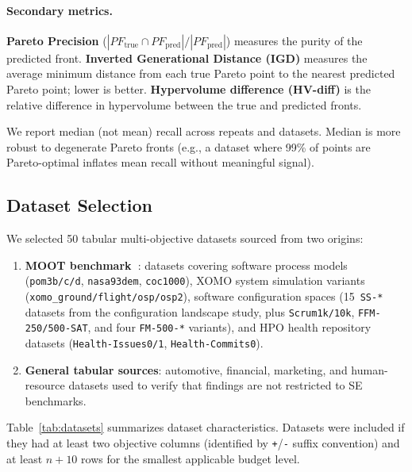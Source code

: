 \documentclass[sigconf,nonacm]{acmart}
\begin{document}
\paragraph{Secondary metrics.}
\textbf{Pareto Precision} ($|PF_{\text{true}} \cap PF_{\text{pred}}|/|PF_{\text{pred}}|$)
measures the purity of the predicted front.
\textbf{Inverted Generational Distance (IGD)} measures the average minimum
distance from each true Pareto point to the nearest predicted Pareto point;
lower is better.
\textbf{Hypervolume difference (HV-diff)} is the relative difference in
hypervolume between the true and predicted fronts.

We report median (not mean) recall across repeats and datasets.
Median is more robust to degenerate Pareto fronts (e.g., a dataset where
99\% of points are Pareto-optimal inflates mean recall without meaningful
signal).

\subsection{Dataset Selection}
\label{sec:datasets}

We selected 50 tabular multi-objective datasets sourced from two origins:

\begin{enumerate}[leftmargin=*]
  \item \textbf{MOOT benchmark~\cite{moot2025}}: datasets covering
  software process models (\texttt{pom3b/c/d}, \texttt{nasa93dem},
  \texttt{coc1000}), XOMO system simulation variants
  (\texttt{xomo\_ground/flight/osp/osp2}), software configuration spaces
  (15~\texttt{SS-*} datasets from the configuration landscape study, plus
  \texttt{Scrum1k/10k}, \texttt{FFM-250/500-SAT}, and four
  \texttt{FM-500-*} variants), and HPO health repository
  datasets (\texttt{Health-Issues0/1}, \texttt{Health-Commits0}).

  \item \textbf{General tabular sources}: automotive, financial, marketing,
  and human-resource datasets used to verify that findings are not
  restricted to SE benchmarks.
\end{enumerate}

\noindent Table~\ref{tab:datasets} summarizes dataset characteristics.
Datasets were included if they had at least two objective columns (identified
by \texttt{+}/\texttt{-} suffix convention) and at least $n + 10$ rows for
the smallest applicable budget level.
\end{document}
